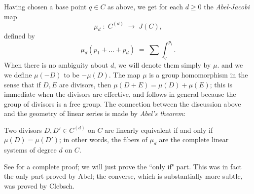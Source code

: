 %

Having chosen a base point $q \in C$ as above, we get for each $d\geq 0$ the \emph{Abel-Jacobi} map
$$
\mu_d \; : \; C^{(d)} \; \to \; J(C),
$$
defined by
$$
\mu_d(p_1 + \dots + p_d) \; = \; \sum \int_q^{p_i}.
$$
When there is no ambiguity about $d$, we will denote them simply by $\mu$.  and we 
we define $\mu(-D)$ to be $-\mu(D)$. 
The map $\mu$ is a group homomorphism in the sense that if $D, E$ are divisors, then
$\mu (D+E) = \mu(D) + \mu(E)$; this is immediate when the divisors are effective, and 
follows in general because the group of divisors is a free group.
The connection between the discussion above and the geometry of linear series is made by \emph{Abel's theorem}:

\begin{theorem}
Two divisors $D, D' \in C^{(d)}$ on $C$ are linearly equivalent if and only if $\mu(D) = \mu(D')$; in other words, the fibers of $\mu_d$ are the complete linear systems of degree $d$ on $C$.
\end{theorem}

See \cite[Section 2.2]{GH}  for a complete proof; we will just prove the ``only if" part. This was in fact the only part proved by Abel; the converse, which is substantially more subtle, was proved by Clebsch.

